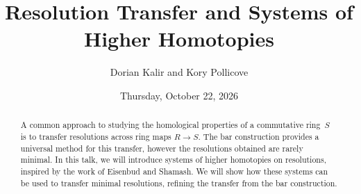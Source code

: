 \documentclass{UAmathtalk}
\author{Dorian Kalir and Kory Pollicove}
\title{Resolution Transfer and Systems of Higher Homotopies}
\date{Thursday, October 22, 2026}
\begin{document}
\maketitle

\begin{abstract}
A common approach to studying the homological properties of a commutative ring~$S$ is to transfer resolutions across ring maps $R \to S$. The bar construction provides a universal method for this transfer, however the resolutions obtained are rarely minimal. In this talk, we will introduce systems of higher homotopies on resolutions, inspired by the work of Eisenbud and Shamash. We will show how these systems can be used to transfer minimal resolutions, refining the transfer from the bar construction.
\end{abstract}
\end{document}
